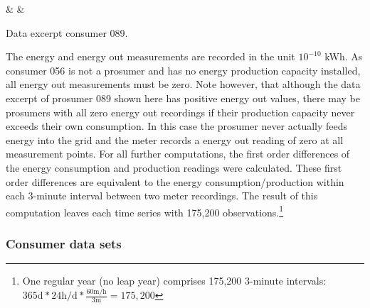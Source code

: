 \begin{table}[h]
    {\csvcolii & \csvcoliii & \csvcoliv}%
    \caption[Data excerpt of prosumer 089]{Data excerpt consumer 089. \quantnet}
\end{table}

The energy and energy out measurements are recorded in the unit $10^{-10}$ kWh. As consumer 056 is not a prosumer and has no energy production capacity installed, all energy out measurements must be zero. Note however, that although the data excerpt of prosumer 089 shown here has positive energy out values, there may be prosumers with all zero energy out recordings if their production capacity never exceeds their own consumption. In this case the prosumer never actually feeds energy into the grid and the meter records a energy out reading of zero at all measurement points.
For all further computations, the first order differences of the energy consumption and production readings were calculated. These first order differences are equivalent to the energy consumption/production within each 3-minute interval between two meter recordings. The result of this computation leaves each time series with 175,200 observations.\footnote{One regular year (no leap year) comprises 175,200 3-minute intervals: $365\text{d} * 24\text{h/d} * \frac{60\text{m/h}}{3\text{m}} = 175,200$}



\subsubsection{Consumer data sets}

